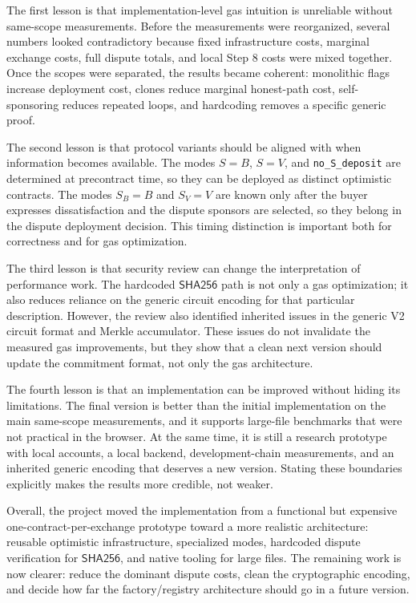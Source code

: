 The first lesson is that implementation-level gas intuition is unreliable without
same-scope measurements. Before the measurements were reorganized, several numbers looked
contradictory because fixed infrastructure costs, marginal exchange costs, full dispute
totals, and local Step 8 costs were mixed together. Once the scopes were separated, the
results became coherent: monolithic flags increase deployment cost, clones reduce marginal
honest-path cost, self-sponsoring reduces repeated loops, and hardcoding removes a specific
generic proof.

The second lesson is that protocol variants should be aligned with when information becomes
available. The modes \(S=B\), \(S=V\), and \texttt{no\_S\_deposit} are determined at
precontract time, so they can be deployed as distinct optimistic contracts. The modes
\(S_B=B\) and \(S_V=V\) are known only after the buyer expresses dissatisfaction and the
dispute sponsors are selected, so they belong in the dispute deployment decision. This
timing distinction is important both for correctness and for gas optimization.

The third lesson is that security review can change the interpretation of performance
work. The hardcoded \(\mathsf{SHA256}\) path is not only a gas optimization; it also
reduces reliance on the generic circuit encoding for that particular description. However,
the review also identified inherited issues in the generic V2 circuit format and Merkle
accumulator. These issues do not invalidate the measured gas improvements, but they show
that a clean next version should update the commitment format, not only the gas
architecture.

The fourth lesson is that an implementation can be improved without hiding its limitations.
The final version is better than the initial implementation on the main same-scope
measurements, and it supports large-file benchmarks that were not practical in the browser.
At the same time, it is still a research prototype with local accounts, a local backend,
development-chain measurements, and an inherited generic encoding that deserves a new
version. Stating these boundaries explicitly makes the results more credible, not weaker.

Overall, the project moved the implementation from a functional but expensive
one-contract-per-exchange prototype toward a more realistic architecture: reusable
optimistic infrastructure, specialized modes, hardcoded dispute verification for
\(\mathsf{SHA256}\), and native tooling for large files. The remaining work is now clearer:
reduce the dominant dispute costs, clean the cryptographic encoding, and decide how far the
factory/registry architecture should go in a future version.
